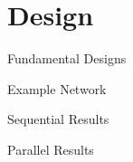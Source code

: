 \section{Design}
\begin{frame}{Fundamental Designs}
\end{frame}

\begin{frame}{Example Network}
\end{frame}

\begin{frame}{Sequential Results}
\end{frame}

\begin{frame}{Parallel Results}
\end{frame}